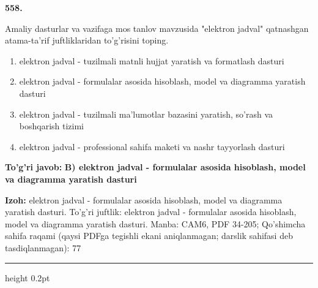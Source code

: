 \documentclass[10pt,a4paper]{article}
\begin{document}
{\bfseries\sffamily\color{ink} 558.}
\par
Amaliy dasturlar va vazifaga mos tanlov mavzusida "elektron jadval" qatnashgan atama-ta'rif juftliklaridan to'g'risini toping.
\begin{enumerate}[label=\Alph*),leftmargin=9mm]
\item elektron jadval - tuzilmali matnli hujjat yaratish va formatlash dasturi
\item elektron jadval - formulalar asosida hisoblash, model va diagramma yaratish dasturi
\item elektron jadval - tuzilmali ma'lumotlar bazasini yaratish, so'rash va boshqarish tizimi
\item elektron jadval - professional sahifa maketi va nashr tayyorlash dasturi
\end{enumerate}
\begin{tcolorbox}[enhanced,breakable,colback=teal!4,colframe=teal!60!black,boxrule=0.45pt,arc=1.2mm,left=2.7mm,right=2.7mm,top=1.8mm,bottom=1.8mm,before skip=2mm,after skip=2mm]
{\bfseries\sffamily\color{teal}To'g'ri javob:} \textbf{B) elektron jadval - formulalar asosida hisoblash, model va diagramma yaratish dasturi}
\par\smallskip
{\bfseries Izoh:} elektron jadval - formulalar asosida hisoblash, model va diagramma yaratish dasturi. To'g'ri juftlik: elektron jadval - formulalar asosida hisoblash, model va diagramma yaratish dasturi. Manba: CAM6, PDF 34-205; Qo'shimcha sahifa raqami (qaysi PDFga tegishli ekani aniqlanmagan; darslik sahifasi deb tasdiqlanmagan): 77
\end{tcolorbox}
\vspace{2mm}\hrule height 0.2pt\vspace{3mm}
\end{document}
